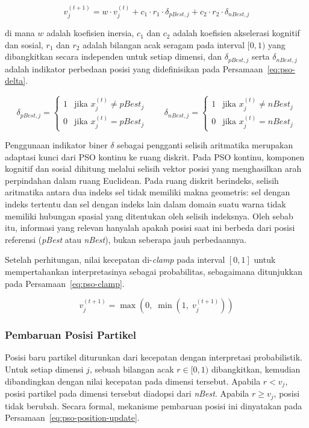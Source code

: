 \begin{equation}
	v_j^{(t+1)} = w \cdot v_j^{(t)} + c_1 \cdot r_1 \cdot \delta_{pBest,j} + c_2 \cdot r_2 \cdot \delta_{nBest,j}
	\label{eq:pso-velocity-update}
\end{equation}

di mana $w$ adalah koefisien inersia, $c_1$ dan $c_2$ adalah koefisien akselerasi kognitif dan sosial, $r_1$ dan $r_2$ adalah bilangan acak seragam pada interval $[0, 1)$ yang dibangkitkan secara independen untuk setiap dimensi, dan $\delta_{pBest,j}$ serta $\delta_{nBest,j}$ adalah indikator perbedaan posisi yang didefinisikan pada Persamaan~\ref{eq:pso-delta}.

\begin{equation}
	\delta_{pBest,j} = \begin{cases} 1 & \text{jika } x_j^{(t)} \neq pBest_j \\ 0 & \text{jika } x_j^{(t)} = pBest_j \end{cases}
	\qquad
	\delta_{nBest,j} = \begin{cases} 1 & \text{jika } x_j^{(t)} \neq nBest_j \\ 0 & \text{jika } x_j^{(t)} = nBest_j \end{cases}
	\label{eq:pso-delta}
\end{equation}

Penggunaan indikator biner $\delta$ sebagai pengganti selisih aritmatika merupakan adaptasi kunci dari PSO kontinu ke ruang diskrit. Pada PSO kontinu, komponen kognitif dan sosial dihitung melalui selisih vektor posisi yang menghasilkan arah perpindahan dalam ruang Euclidean. Pada ruang diskrit berindeks, selisih aritmatika antara dua indeks sel tidak memiliki makna geometris: sel dengan indeks tertentu dan sel dengan indeks lain dalam domain suatu warna tidak memiliki hubungan spasial yang ditentukan oleh selisih indeksnya. Oleh sebab itu, informasi yang relevan hanyalah apakah posisi saat ini berbeda dari posisi referensi (\textit{pBest} atau \textit{nBest}), bukan seberapa jauh perbedaannya.

Setelah perhitungan, nilai kecepatan di-\textit{clamp} pada interval $[0, 1]$ untuk mempertahankan interpretasinya sebagai probabilitas, sebagaimana ditunjukkan pada Persamaan~\ref{eq:pso-clamp}.

\begin{equation}
	v_j^{(t+1)} = \max(0,\; \min(1,\; v_j^{(t+1)}))
	\label{eq:pso-clamp}
\end{equation}

\subsubsection{Pembaruan Posisi Partikel}
\label{subsubsec:update-position}
Posisi baru partikel diturunkan dari kecepatan dengan interpretasi probabilistik. Untuk setiap dimensi $j$, sebuah bilangan acak $r \in [0, 1)$ dibangkitkan, kemudian dibandingkan dengan nilai kecepatan pada dimensi tersebut. Apabila $r < v_j$, posisi partikel pada dimensi tersebut diadopsi dari \textit{nBest}. Apabila $r \geq v_j$, posisi tidak berubah. Secara formal, mekanisme pembaruan posisi ini dinyatakan pada Persamaan~\ref{eq:pso-position-update}.

